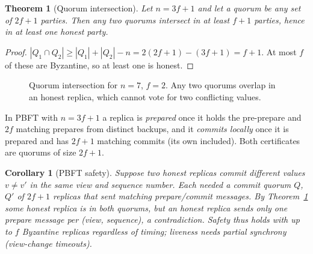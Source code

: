 \documentclass[11pt,a4paper]{article}
\newenvironment{formal}{\par\smallskip}{\par\smallskip}
\theoremstyle{definition}
\theoremstyle{plain}
\newtheorem{theorem}[definition]{Theorem}
\newtheorem{corollary}[definition]{Corollary}
\theoremstyle{remark}
\begin{document}
\begin{formal}
\begin{theorem}[Quorum intersection]\label{thm:quorum}
Let $n=3f+1$ and let a quorum be any set of $2f+1$ parties. Then any two quorums intersect in at least $f+1$ parties, hence in at least one honest party.
\end{theorem}
\begin{proof}
$|Q_1\cap Q_2|\ge|Q_1|+|Q_2|-n=2(2f+1)-(3f+1)=f+1$. At most $f$ of these are Byzantine, so at least one is honest.
\end{proof}

\begin{figure}[htbp]
\centering
{}
\caption{Quorum intersection for $n=7$, $f=2$. Any two quorums overlap in an honest replica, which cannot vote for two conflicting values.}
\end{figure}

In PBFT with $n=3f+1$ a replica is \emph{prepared} once it holds the pre-prepare and $2f$ matching prepares from distinct backups, and it \emph{commits locally} once it is prepared and has $2f+1$ matching commits (its own included). Both certificates are quorums of size $2f+1$.

\begin{corollary}[PBFT safety]
Suppose two honest replicas commit different values $v\ne v'$ in the same view and sequence number. Each needed a commit quorum $Q$, $Q'$ of $2f+1$ replicas that sent matching prepare/commit messages. By Theorem~\ref{thm:quorum} some honest replica is in both quorums, but an honest replica sends
only one prepare message per (view, sequence), a contradiction. Safety thus holds with up to $f$ Byzantine replicas \emph{regardless of timing}; liveness needs partial synchrony (view-change timeouts).
\end{corollary}
\end{formal}
\end{document}
